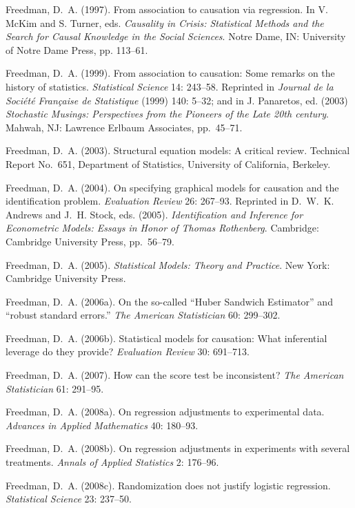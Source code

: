 \smallskip\noindent
Freedman, D.~A. (1997).
From association to causation via regression.
In V. McKim and S. Turner, eds.
{\it Causality in Crisis:
Statistical Methods and the Search for Causal Knowledge in the Social Sciences\/}.
Notre Dame, IN: University of Notre Dame Press, pp. 113--61.

\smallskip\noindent
Freedman, D.~A. (1999).
From association to causation: Some remarks on the history of statistics.
{\it Statistical Science\/} 14: 243--58.
Reprinted in {\it Journal de la Soci\'et\'e Fran\c caise de Statistique\/} (1999) 140: 5--32;
and in J. Panaretos, ed. (2003)
{\it Stochastic Musings: Perspectives from the Pioneers of the Late 20th century\/}.
Mahwah, NJ: Lawrence Erlbaum Associates, pp.~45--71.

\smallskip\noindent
Freedman, D.~A. (2003).
Structural equation models: A critical review.
Technical Report No.~651, Department of Statistics,
University of California, Berkeley.

\smallskip\noindent
Freedman, D.~A. (2004).
On specifying graphical models for causation and the identification problem.
{\it Evaluation Review\/} 26: 267--93.
Reprinted in D.~W.~K. Andrews and J.~H. Stock, eds. (2005).
{\it Identification and Inference for Econometric Models: Essays in Honor of Thomas Rothenberg\/}.
Cambridge: Cambridge University Press, pp.~56--79.

\smallskip\noindent
Freedman, D.~A. (2005).
{\it Statistical Models: Theory and Practice\/}.
New York: Cambridge University Press.

\smallskip\noindent
Freedman, D.~A. (2006a).
On the so-called ``Huber Sandwich Estimator'' and ``robust standard errors.''
{\it The American Statistician\/} 60: 299--302.

\smallskip\noindent
Freedman, D.~A. (2006b).
Statistical models for causation:
What inferential leverage do they provide?
{\it Evaluation Review\/} 30: 691--713.

\smallskip\noindent
Freedman, D.~A. (2007).
How can the score test be inconsistent?
{\it The American Statistician\/} 61: 291--95.

\smallskip\noindent
Freedman, D.~A. (2008a).
On regression adjustments to experimental data.
{\it Advances in Applied Mathematics\/} 40: 180--93.

\smallskip\noindent
Freedman, D.~A. (2008b).
On regression adjustments in experiments with several treatments.
{\it Annals of Applied Statistics\/} 2: 176--96.

\smallskip\noindent
Freedman, D.~A. (2008c).
Randomization does not justify logistic regression.
{\it Statistical Science\/} 23: 237--50.


